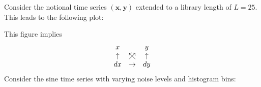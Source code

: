 \documentclass[a4paper,11pt]{article}
\begin{document}
Consider the notional time series $(\mathbf{x},\mathbf{y})$ extended to a library length of $L=25$.  This leads to the following plot:

This figure implies
$$
\begin{array}{ccc}
x & & y\\
\uparrow &\mathrel{\ooalign{\hss$\nearrow$\hss\cr$\nwarrow$}} & \uparrow\\
dx &\rightarrow & dy
\end{array}
$$
Consider the sine time series with varying noise levels and histogram bins:
\end{document}
